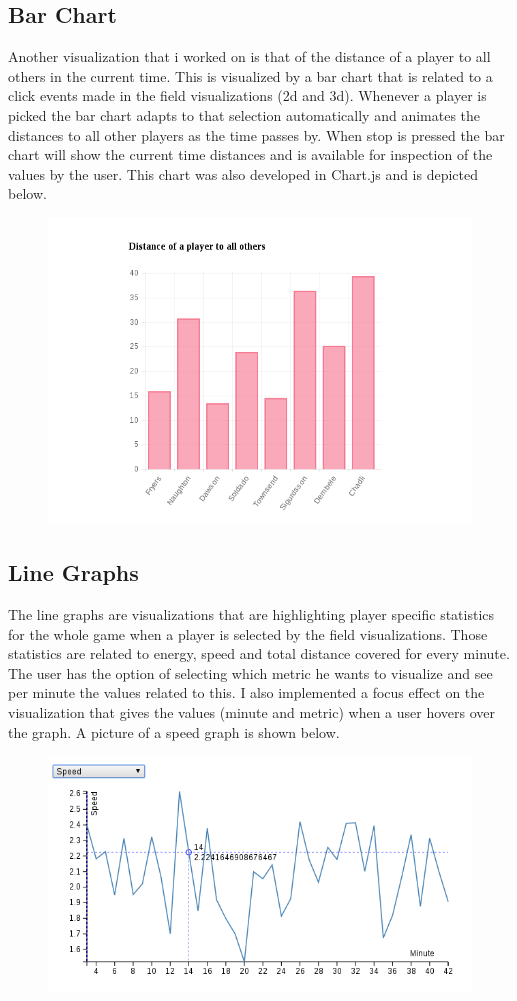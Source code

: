 \documentclass{article}
\begin{document}
\subsection{Bar Chart}
Another visualization that i worked on is that of the distance of a player to all others in the current time. This is visualized by a bar chart that is related to a click events made in the field visualizations (2d and 3d). Whenever a player is picked the bar chart adapts to that selection automatically and animates the distances to all other players as the time passes by. When stop is pressed the bar chart will show the current time distances and is available for inspection of the values by the user. This chart was also developed in Chart.js and is depicted below.

\begin{figure}[ht!]
\centering
\includegraphics[scale=0.35]{bar}
\end{figure}

\subsection{Line Graphs}
The line graphs are visualizations that are highlighting player specific statistics for the whole game when a player is selected by the field visualizations. Those statistics are related to energy, speed and total distance covered for every minute. The user has the option of selecting which metric he wants to visualize and see per minute the values related to this. I also implemented a focus effect on the visualization that gives the values (minute and metric) when a user hovers over the graph. A picture of a speed graph is shown below.

\begin{figure}[ht!]
\centering
\includegraphics[scale=0.35]{line}
\end{figure}
 



\end{document}
